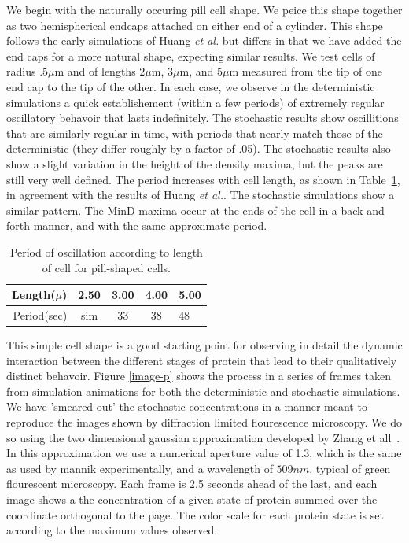 \documentclass[letterpaper,twocolumn,amsmath,amssymb,pre]{revtex4-1}
\newcommand\micron{\ensuremath{\mu\text{m}}}
\begin{document}
We begin with the naturally occuring pill cell shape.  We peice this
shape together as two hemispherical endcaps attached on either end of
a cylinder.  This shape follows the early simulations of Huang
\emph{et al.} but differs in that we have added the end caps for a
more natural shape, expecting similar results.  We test cells of
radius $.5\micron$ and of lengths $2\micron$, $3\micron$, and
$5\micron$ measured from the tip of one end cap to the tip of the
other. In each case, we observe in the deterministic simulations a
quick establishement (within a few periods) of extremely regular
oscillatory behavoir that lasts indefinitely.  The stochastic results
show oscillitions that are similarly regular in time, with periods
that nearly match those of the deterministic (they differ roughly by a
factor of .05). The stochastic results also show a slight variation in
the height of the density maxima, but the peaks are still very well
defined. The period increases with cell length, as shown in
Table~\ref{tab:pill-periods}, in agreement with the results of Huang
\emph{et al.}.  The stochastic simulations show a similar pattern.
The MinD maxima occur at the ends of the cell in a back and forth
manner, and with the same approximate period.

\begin{table}
  \begin{tabular}{|r|c|c|c|l|}
    \hline
    Length($\mu$) & 2.50 & 3.00 & 4.00 & 5.00\\
    \hline
    Period(sec) & sim & 33 & 38 & 48 \\ \cline{2-2}
    \hline
  \end{tabular}
  \caption{Period of oscillation according to length of cell for
    pill-shaped cells.}\label{tab:pill-periods}
\end{table}

This simple cell shape is a good starting point for observing in
detail the dynamic interaction between the different stages of protein
that lead to their qualitatively distinct behavoir. Figure
\ref{image-p} shows the process in a series of frames taken from
simulation animations for both the deterministic and stochastic
simulations.  We have 'smeared out' the stochastic concentrations in a
manner meant to reproduce the images shown by diffraction limited
flourescence microscopy.  We do so using the two dimensional gaussian
approximation developed by Zhang et all~\cite{zhang2007gaussian}.  In
this approximation we use a numerical aperture value of 1.3, which is
the same as used by mannik experimentally, and a wavelength of
$509nm$, typical of green flourescent microscopy.  Each frame is 2.5
seconds ahead of the last, and each image shows a the concentration of
a given state of protein summed over the coordinate orthogonal to the
page.  The color scale for each protein state is set according to the
maximum values observed.
\end{document}
